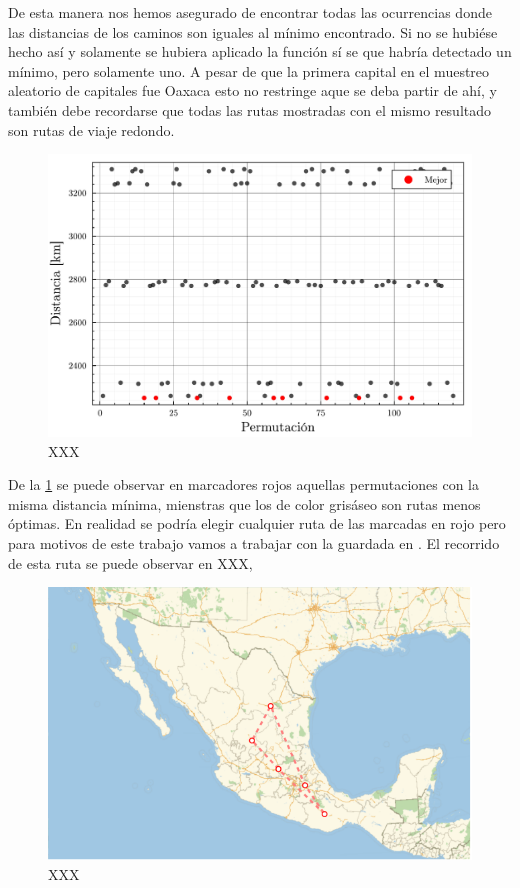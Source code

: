 De esta manera nos hemos asegurado de encontrar todas las ocurrencias donde las distancias de los caminos son iguales al mínimo encontrado. Si no se hubiése hecho así y solamente se hubiera aplicado la función  sí se que habría detectado un mínimo, pero solamente uno. A pesar de que la primera capital en el muestreo aleatorio de capitales fue Oaxaca esto no restringe aque se deba partir de ahí, y también debe recordarse que todas las rutas mostradas con el mismo resultado son rutas de viaje redondo.
\begin{figure}[ht!]
    \centering
    \includegraphics[scale=0.5]{../figures/distances_cities_05_bruteforce.pdf}
    \caption{XXX}
    \label{fig:bruteforce_distances_cities_05}
\end{figure}

De la \cref{fig:bruteforce_distances_cities_05} se puede observar en marcadores rojos aquellas permutaciones con la misma distancia mínima, mienstras que los de color grisáseo son rutas menos óptimas. En realidad se podría elegir cualquier ruta de las marcadas en rojo pero para motivos de este trabajo vamos a trabajar con la guardada en . El recorrido de esta ruta se puede observar en XXX,
\begin{figure}[ht]
    \centering
    \includegraphics[scale=0.8]{../figures/trip_cities_05_bruteforce.pdf}
    \caption{XXX}
    \label{fig:bruteforce_path_cities_05}
\end{figure}

